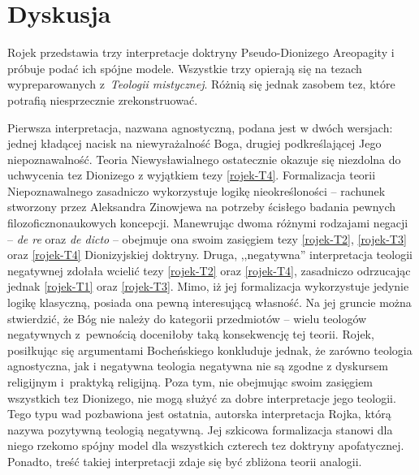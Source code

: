 \section{Dyskusja}\label{roj-dyskusja}

Rojek przedstawia trzy interpretacje doktryny Pseudo-Dionizego Areopagity i próbuje podać
ich spójne modele. Wszystkie trzy opierają się na tezach
wypreparowanych z~\textit{Teologii mistycznej}. Różnią się jednak zasobem tez, które potrafią niesprzecznie
zrekonstruować.

Pierwsza interpretacja, nazwana agnostyczną, podana jest w dwóch
wersjach: jednej kładącej nacisk na niewyrażalność Boga, drugiej
podkreślającej Jego niepoznawalność. Teoria Niewysławialnego ostatecznie okazuje
się niezdolna do uchwycenia tez Dionizego z wyjątkiem tezy \eqref{rojek-T4}.
Formalizacja teorii Niepoznawalnego zasadniczo wykorzystuje logikę
nieokreśloności -- rachunek stworzony przez Aleksandra Zinowjewa na
potrzeby ścisłego badania pewnych filozoficznonaukowych koncepcji.
Manewrując dwoma różnymi rodzajami negacji -- \textit{de re} oraz
\textit{de dicto} -- obejmuje ona swoim zasięgiem 
tezy \eqref{rojek-T2}, \eqref{rojek-T3} oraz \eqref{rojek-T4} Dionizyjskiej doktryny.
%
Druga, ,,negatywna'' interpretacja teologii negatywnej zdołała wcielić
tezy \eqref{rojek-T2} oraz \eqref{rojek-T4}, zasadniczo odrzucając jednak \eqref{rojek-T1} oraz \eqref{rojek-T3}. Mimo,
iż jej formalizacja wykorzystuje jedynie logikę klasyczną, posiada ona
pewną interesującą własność. Na jej gruncie można stwierdzić, że Bóg
nie należy do kategorii przedmiotów -- wielu teologów negatywnych z~pewnością doceniłoby taką konsekwencję tej teorii.  Rojek, posiłkując się argumentami Bocheńskiego konkluduje jednak, że zarówno
teologia agnostyczna, jak i negatywna teologia negatywna nie są zgodne z
dyskursem religijnym i~praktyką religijną. Poza tym, nie obejmując
swoim zasięgiem wszystkich tez Dionizego, nie mogą służyć za dobre
interpretacje jego teologii.
%
Tego typu wad pozbawiona jest ostatnia, autorska
interpretacja Rojka, którą nazywa pozytywną teologią negatywną. Jej szkicowa
formalizacja stanowi dla niego rzekomo spójny model dla wszystkich czterech tez doktryny
apofatycznej. Ponadto, treść takiej interpretacji zdaje się być zbliżona teorii analogii.

